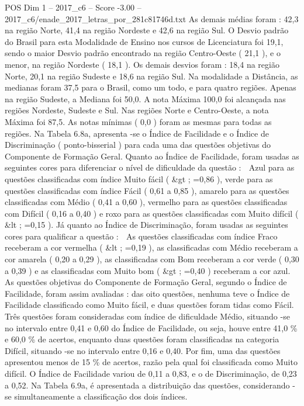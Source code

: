 \begin{textsample}{POS Dim 1 – 2017\_c6 – Score -3.00 – 2017\_c6/enade\_2017\_letras\_por\_281c81746d.txt}
As demais médias foram : 42,3 na região Norte, 41,4 na região Nordeste e 42,6 na região Sul.
O Desvio padrão do Brasil para esta Modalidade de Ensino nos cursos de Licenciatura foi 19,1, sendo o maior Desvio padrão encontrado na região Centro-Oeste ( 21,1 ), e o menor, na região Nordeste ( 18,1 ).
Os demais desvios foram : 18,4 na região Norte, 20,1 na região Sudeste e 18,6 na região Sul.
Na modalidade a Distância, as medianas foram 37,5 para o Brasil, como um todo, e para quatro regiões.
Apenas na região Sudeste, a Mediana foi 50,0.
A nota Máxima 100,0 foi alcançada nas regiões Nordeste, Sudeste e Sul.
Nas regiões Norte e Centro-Oeste, a nota Máxima foi 87,5.
As notas mínimas ( 0,0 ) foram as mesmas para todas as regiões.
Na Tabela 6.8a, apresenta -se o Índice de Facilidade e o Índice de Discriminação ( ponto-bisserial ) para cada uma das questões objetivas do Componente de Formação Geral.
Quanto ao Índice de Facilidade, foram usadas as seguintes cores para diferenciar o nível de dificuldade da questão :  Azul para as questões classificadas com índice Muito fácil ( \&gt ; =0,86 ), verde para as questões classificadas com índice Fácil ( 0,61 a 0,85 ), amarelo para as questões classificadas com Médio ( 0,41 a 0,60 ), vermelho para as questões classificadas com Difícil ( 0,16 a 0,40 ) e roxo para as questões classificadas com Muito difícil ( \&lt ; =0,15 ).
Já quanto ao Índice de Discriminação, foram usadas as seguintes cores para qualificar a questão :  As questões classificadas com índice Fraco receberam a cor vermelha ( \&lt ; =0,19 ), as classificadas com Médio receberam a cor amarela ( 0,20 a 0,29 ), as classificadas com Bom receberam a cor verde ( 0,30 a 0,39 ) e as classificadas com Muito bom ( \&gt ; =0,40 ) receberam a cor azul.
As questões objetivas do Componente de Formação Geral, segundo o Índice de Facilidade, foram assim avaliadas : das oito questões, nenhuma teve o Índice de Facilidade classificado como Muito fácil, e duas questões foram tidas como Fácil.
Três questões foram consideradas com índice de dificuldade Médio, situando -se no intervalo entre 0,41 e 0,60 do Índice de Facilidade, ou seja, houve entre 41,0 \% e 60,0 \% de acertos, enquanto duas questões foram classificadas na categoria Difícil, situando -se no intervalo entre 0,16 e 0,40.
Por fim, uma das questões apresentou menos de 15 \% de acertos, razão pela qual foi classificada como Muito difícil.
O Índice de Facilidade variou de 0,11 a 0,83, e o de Discriminação, de 0,23 a 0,52.
Na Tabela 6.9a, é apresentada a distribuição das questões, considerando -se simultaneamente a classificação dos dois índices.

\end{textsample}
